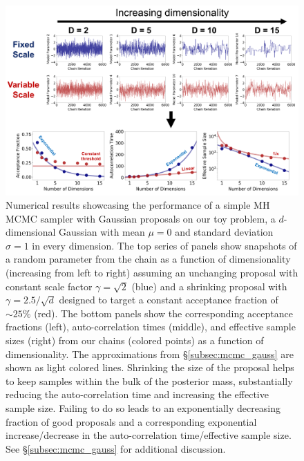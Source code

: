 \documentclass[12pt, titlepage]{article}
\begin{document}
\begin{figure}
\begin{center}
\includegraphics[width=\textwidth]{figures/fig13.png}
\end{center}
\caption{Numerical results showcasing the performance
of a simple MH MCMC sampler with Gaussian proposals
on our toy problem, a $d$-dimensional Gaussian with mean $\mu=0$
and standard deviation $\sigma=1$ in every dimension.
The top series of panels show snapshots of a random parameter
from the chain as a function of dimensionality (increasing
from left to right) assuming an unchanging proposal with
constant scale factor $\gamma=\sqrt{2}$ (blue) 
and a shrinking proposal with $\gamma=2.5/\sqrt{d}$ designed
to target a constant acceptance fraction of $\sim 25\%$ (red).
The bottom panels show the corresponding
acceptance fractions (left), auto-correlation times (middle), and
effective sample sizes (right) from our chains (colored points)
as a function of dimensionality. The approximations from 
\S\ref{subsec:mcmc_gauss} are shown as light colored lines.
Shrinking the size of the proposal helps to keep samples 
within the bulk of the posterior mass, substantially reducing
the auto-correlation time and increasing the effective sample size.
Failing to do so leads to
an exponentially decreasing fraction of good
proposals and a corresponding exponential increase/decrease in the
auto-correlation time/effective sample size.
See \S\ref{subsec:mcmc_gauss} for additional discussion.
}\label{fig:mcmc_gauss}
\end{figure}
\end{document}
